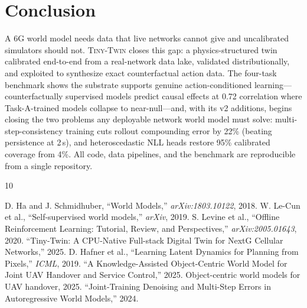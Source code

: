 \documentclass[10pt,conference]{IEEEtran}
\newcommand{\twin}{\textsc{Tiny-Twin}}
\begin{document}
\section{Conclusion}
A 6G world model needs data that live networks cannot give and uncalibrated simulators should not.
\twin{} closes this gap: a physics-structured twin calibrated end-to-end from a real-network data lake, validated distributionally, and exploited to synthesize exact counterfactual action data.
The four-task benchmark shows the substrate supports genuine action-conditioned learning---counterfactually supervised models predict causal effects at 0.72 correlation where Task-A-trained models collapse to near-null---and, with its v2 additions, begins closing the two problems any deployable network world model must solve: multi-step-consistency training cuts rollout compounding error by 22\% (beating persistence at 2\,s), and heteroscedastic NLL heads restore 95\% calibrated coverage from 4\%.
All code, data pipelines, and the benchmark are reproducible from a single repository.

\begin{thebibliography}{10}

 D. Ha and J. Schmidhuber, ``World Models,'' \emph{arXiv:1803.10122}, 2018.
 W. Le-Cun et al., ``Self-supervised world models,'' \emph{arXiv}, 2019.
 S. Levine et al., ``Offline Reinforcement Learning: Tutorial, Review, and Perspectives,'' \emph{arXiv:2005.01643}, 2020.
 ``Tiny-Twin: A CPU-Native Full-stack Digital Twin for NextG Cellular Networks,'' 2025.
 D. Hafner et al., ``Learning Latent Dynamics for Planning from Pixels,'' \emph{ICML}, 2019.
 ``A Knowledge-Assisted Object-Centric World Model for Joint UAV Handover and Service Control,'' 2025.
 Object-centric world models for UAV handover, 2025.
 ``Joint-Training Denoising and Multi-Step Errors in Autoregressive World Models,'' 2024.

\end{thebibliography}
\end{document}
